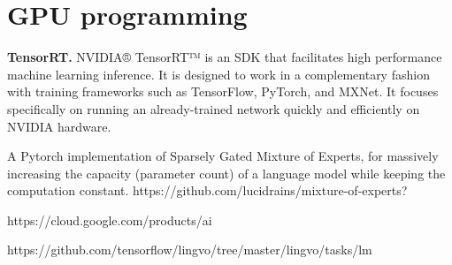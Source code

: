 


\section{GPU programming}
\textbf{TensorRT.}
NVIDIA® TensorRT™ is an SDK that facilitates high performance machine learning
inference. It is designed to work in a complementary fashion with training frameworks
such as TensorFlow, PyTorch, and MXNet. It focuses specifically on running an already-trained 
network quickly and efficiently on NVIDIA hardware.

A Pytorch implementation of Sparsely Gated Mixture of Experts, for massively 
increasing the capacity (parameter count) of a language model while keeping 
the computation constant.
https://github.com/lucidrains/mixture-of-experts?

https://cloud.google.com/products/ai

https://github.com/tensorflow/lingvo/tree/master/lingvo/tasks/lm